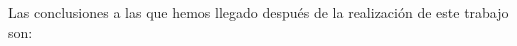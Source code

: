 \parindent=1cm
\raggedright
Las conclusiones a las que hemos llegado después de la realización de este trabajo son:


